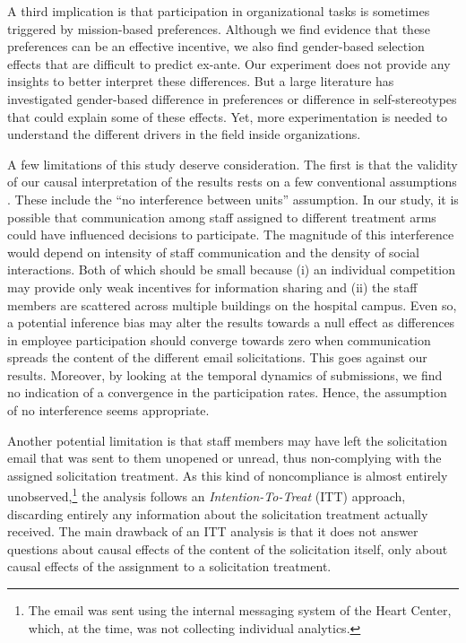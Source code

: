 \documentclass[12pt, titlepage]{article}
\begin{document}
A third implication is that participation in organizational tasks is
sometimes triggered by mission-based preferences. Although we find
evidence that these preferences can be an effective incentive, we also
find gender-based selection effects that are difficult to predict
ex-ante. Our experiment does not provide any insights to better
interpret these differences. But a large literature has investigated
gender-based difference in preferences \citep[see][ for a
review]{croson2009gender} or difference in self-stereotypes
\citep{coffman2014evidence} that could explain some of these effects.
Yet, more experimentation is needed to understand the different drivers
in the field inside organizations.

A few limitations of this study deserve consideration. The first is that
the validity of our causal interpretation of the results rests on a few
conventional assumptions \citep{rubin1974estimating}. These include the
``no interference between units'' assumption. In our study, it is
possible that communication among staff assigned to different treatment
arms could have influenced decisions to participate. The magnitude of
this interference would depend on intensity of staff communication and
the density of social interactions. Both of which should be small
because (i) an individual competition may provide only weak incentives
for information sharing and (ii) the staff members are scattered across
multiple buildings on the hospital campus. Even so, a potential
inference bias may alter the results towards a null effect as
differences in employee participation should converge towards zero when
communication spreads the content of the different email solicitations.
This goes against our results. Moreover, by looking at the temporal
dynamics of submissions, we find no indication of a convergence in the
participation rates. Hence, the assumption of no interference seems
appropriate.

Another potential limitation is that staff members may have left the
solicitation email that was sent to them unopened or unread, thus
non-complying with the assigned solicitation treatment. As this kind of
noncompliance is almost entirely unobserved,\footnote{The email was sent
  using the internal messaging system of the Heart Center, which, at the
  time, was not collecting individual analytics.} the analysis follows
an \emph{Intention-To-Treat} (ITT) approach, discarding entirely any
information about the solicitation treatment actually received. The main
drawback of an ITT analysis is that it does not answer questions about
causal effects of the content of the solicitation itself, only about
causal effects of the assignment to a solicitation treatment.
\end{document}
